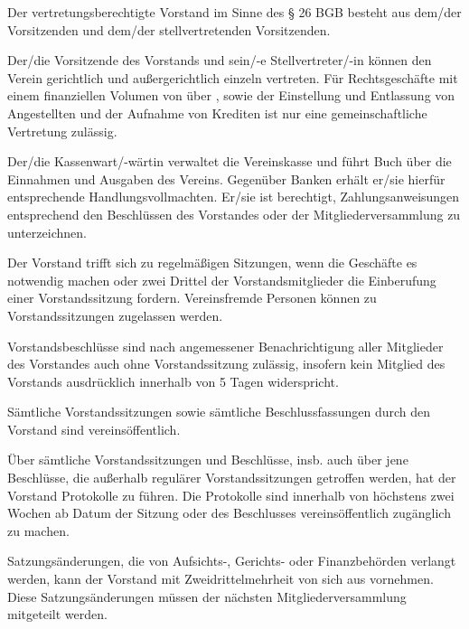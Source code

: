 \documentclass[draft]{scrartcl}
\begin{document}
\begin{contract}

Der vertretungsberechtigte Vorstand im Sinne des § 26 BGB besteht aus dem/der
Vorsitzenden und dem/der stellvertretenden Vorsitzenden.

Der/die Vorsitzende des Vorstands und sein/-e Stellvertreter/-in können den
Verein gerichtlich und außergerichtlich einzeln vertreten. Für Rechtsgeschäfte
mit einem finanziellen Volumen von über , sowie der Einstellung und
Entlassung von Angestellten und der Aufnahme von Krediten ist nur eine
gemeinschaftliche Vertretung zulässig.

Der/die Kassenwart/-wärtin verwaltet die Vereinskasse und führt Buch über die
Einnahmen und Ausgaben des Vereins. Gegenüber Banken erhält er/sie hierfür
entsprechende Handlungsvollmachten. Er/sie ist berechtigt, Zahlungsanweisungen
entsprechend den Beschlüssen des Vorstandes oder der Mitgliederversammlung zu
unterzeichnen.


Der Vorstand trifft sich zu regelmäßigen Sitzungen, wenn die Geschäfte es
notwendig machen oder zwei Drittel der Vorstandsmitglieder die Einberufung
einer Vorstandssitzung fordern. Vereinsfremde Personen können zu
Vorstandssitzungen zugelassen werden.

Vorstandsbeschlüsse sind nach angemessener Benachrichtigung aller Mitglieder
des Vorstandes auch ohne Vorstandssitzung zulässig, insofern kein Mitglied
des Vorstands ausdrücklich innerhalb von 5 Tagen widerspricht.

Sämtliche Vorstandssitzungen sowie sämtliche Beschlussfassungen durch
den Vorstand sind vereinsöffentlich.

Über sämtliche Vorstandssitzungen und Beschlüsse, insb. auch über jene
Beschlüsse, die außerhalb regulärer Vorstandssitzungen getroffen werden, hat
der Vorstand Protokolle zu führen. Die Protokolle sind innerhalb von höchstens
zwei Wochen ab Datum der Sitzung oder des Beschlusses vereinsöffentlich
zu\-gäng\-lich zu machen.


Satzungsänderungen, die von Aufsichts-, Gerichts- oder Finanzbehörden verlangt
werden, kann der Vorstand mit Zweidrittelmehrheit von sich aus vornehmen.
Diese Satzungsänderungen müssen der nächsten Mitgliederversammlung mitgeteilt
werden.



\end{contract}
\end{document}
